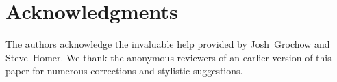 \section{Acknowledgments}

The authors acknowledge the invaluable help provided by Josh~Grochow and Steve~Homer.
We thank the anonymous reviewers of an earlier version of this paper for numerous corrections and stylistic suggestions.

